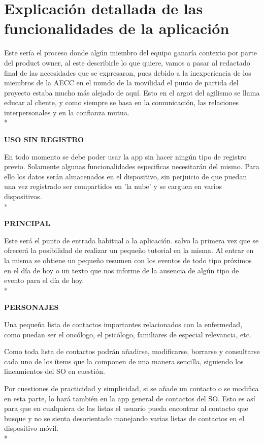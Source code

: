 \documentclass[../pfc.tex]{subfiles}
\begin{document}
	\section{Explicación detallada de las funcionalidades de la aplicación}

Este sería el proceso donde algún miembro del equipo ganaría contexto por parte del product owner, al este describirle lo que quiere, vamos a pasar al redactado final de las necesidades que se expresaron, pues debido a la inexperiencia de los miembros de la AECC en el mundo de la movilidad el punto de partida del proyecto estaba mucho más alejado de aquí. Esto en el argot del agilismo se llama educar al cliente, y como siempre se basa en la comunicación, las relaciones interpersonales y en la confianza mutua.\\*

\textbf{USO SIN REGISTRO}

En todo momento se debe poder usar la app sin hacer ningún tipo de registro previo. Solamente algunas funcionalidades especificas necesitarán del mismo. Para ello los datos serán almacenados en el dispositivo, sin perjuicio de que puedan una vez registrado ser compartidos en 'la nube' y se carguen en varios dispositivos.\\*

	\textbf{PRINCIPAL}
	
	Este será el punto de entrada habitual a la aplicación. salvo la primera vez que se ofrecerá la posibilidad de realizar un pequeño tutorial en la misma. Al entrar en la misma se obtiene un pequeño resumen con los eventos de todo tipo próximos en el día de hoy o un texto que nos informe de la ausencia de algún tipo de evento para el día de hoy.\\*

	
	\textbf{PERSONAJES}
	
	Una pequeña lista de contactos importantes relacionados con la enfermedad, como puedan ser el oncólogo, el psicólogo, familiares de especial relevancia, etc.
	
	Como toda lista de contactos podrán añadirse, modificarse, borrarse y consultarse cada uno de los ítems que la componen de una manera sencilla, siguiendo los lineamientos del SO en cuestión.
	
	Por cuestiones de practicidad y simplicidad, si se añade un contacto o se modifica en esta parte, lo hará también en la app general de contactos del SO. Esto es así para que en cualquiera de las listas el usuario pueda encontrar al contacto que busque y no se sienta desorientado manejando varias listas de contactos en el dispositivo móvil. \\*
	
\end{document}
